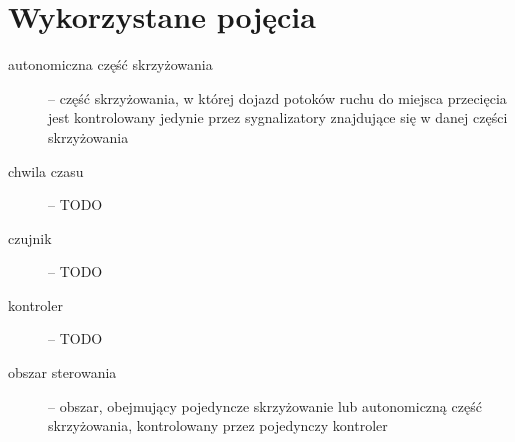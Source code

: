 \chapter{Wykorzystane pojęcia}

\begin{description}

\item[autonomiczna część skrzyżowania] --
część skrzyżowania, w której dojazd potoków ruchu do miejsca przecięcia jest kontrolowany
jedynie przez sygnalizatory znajdujące się w danej części skrzyżowania

\item[chwila czasu] -- TODO

\item[czujnik] -- TODO

\item[kontroler] -- TODO

\item[obszar sterowania] --
obszar, obejmujący pojedyncze skrzyżowanie lub autonomiczną część skrzyżowania,
kontrolowany przez pojedynczy kontroler

\end{description}